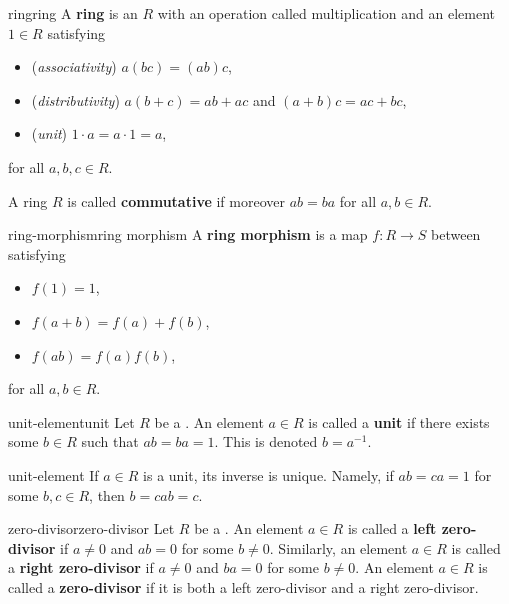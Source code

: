 \begin{topic}{ring}{ring}
    A \textbf{ring} is an  $R$ with an operation called multiplication and an element $1 \in R$ satisfying
    \begin{itemize}
        \item (\textit{associativity}) $a(bc) = (ab)c$,
        \item (\textit{distributivity}) $a(b + c) = ab + ac$ and $(a + b)c = ac + bc$,
        \item (\textit{unit}) $1 \cdot a = a \cdot 1 = a$,
    \end{itemize}
    for all $a, b, c \in R$.
    
    A ring $R$ is called \textbf{commutative} if moreover $ab = ba$ for all $a, b \in R$.
\end{topic}

\begin{topic}{ring-morphism}{ring morphism}
    A \textbf{ring morphism} is a map $f : R \to S$ between  satisfying
    \begin{itemize}
        \item $f(1) = 1$,
        \item $f(a + b) = f(a) + f(b)$,
        \item $f(ab) = f(a) f(b)$,
    \end{itemize}
    for all $a, b \in R$.
\end{topic}

\begin{topic}{unit-element}{unit}
    Let $R$ be a . An element $a \in R$ is called a \textbf{unit} if there exists some $b \in R$ such that $ab = ba = 1$. This is denoted $b = a^{-1}$.
\end{topic}

\begin{example}{unit-element}
    If $a \in R$ is a unit, its inverse is unique. Namely, if $ab = ca = 1$ for some $b, c \in R$, then $b = cab = c$.
\end{example}

\begin{topic}{zero-divisor}{zero-divisor}
    Let $R$ be a . An element $a \in R$ is called a \textbf{left zero-divisor} if $a \ne 0$ and $ab = 0$ for some $b \ne 0$. Similarly, an element $a \in R$ is called a \textbf{right zero-divisor} if $a \ne 0$ and $ba = 0$ for some $b \ne 0$. An element $a \in R$ is called a \textbf{zero-divisor} if it is both a left zero-divisor and a right zero-divisor.
\end{topic}

